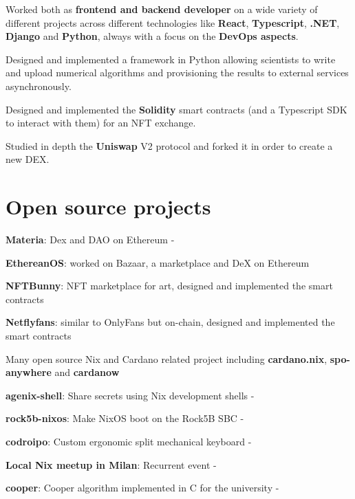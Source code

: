 \documentclass[]{cv}
\begin{document}
\begin{minipage}[t]{0.75\textwidth}
\begin{tightemize}
\item Worked both as \textbf{frontend and backend developer} on a wide variety of different projects across different technologies like \textbf{React}, \textbf{Typescript}, \textbf{.NET}, \textbf{Django} and \textbf{Python}, always with a focus on the \textbf{DevOps aspects}.
\item Designed and implemented a framework in Python allowing scientists to write and upload numerical algorithms and provisioning the results to external services asynchronously.
\item Designed and implemented the \textbf{Solidity} smart contracts (and a Typescript SDK to interact with them) for an NFT exchange.
\item Studied in depth the \textbf{Uniswap} V2 protocol and forked it in order to create a new DEX.
\end{tightemize}
\sectionsep


\section{Open source projects}
\vspace{+0.5em}
\begin{tightemize}
\item \textbf{Materia}: Dex and DAO on Ethereum - 
\item \textbf{EthereanOS}: worked on Bazaar, a marketplace and DeX on Ethereum
\item \textbf{NFTBunny}: NFT marketplace for art, designed and implemented the smart contracts
\item \textbf{Netflyfans}: similar to OnlyFans but on-chain, designed and implemented the smart contracts
\item Many open source Nix and Cardano related project including \textbf{cardano.nix}, \textbf{spo-anywhere} and \textbf{cardanow}
\item \textbf{agenix-shell}: Share secrets using Nix development shells - 
\item \textbf{rock5b-nixos}: Make NixOS boot on the Rock5B SBC - 
\item \textbf{codroipo}: Custom ergonomic split mechanical keyboard - 
\item \textbf{Local Nix meetup in Milan}: Recurrent event - 
\item \textbf{cooper}: Cooper algorithm implemented in C for the university - 


\end{tightemize}
\end{minipage}
\end{document}
